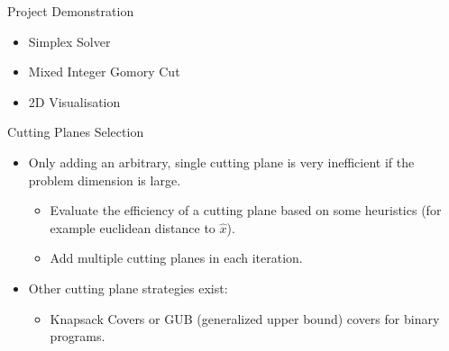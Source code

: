 \begin{frame}{Project Demonstration}
\begin{itemize}
\item Simplex Solver
\item Mixed Integer Gomory Cut
\item 2D Visualisation
\end{itemize}

%    
\end{frame}

\begin{frame}{Cutting Planes Selection}
\begin{itemize}[<+->]
\item Only adding an arbitrary, single cutting plane is very inefficient if the problem dimension is large.
\begin{itemize}
\item Evaluate the efficiency of a cutting plane based on some heuristics (for example euclidean distance to $\hat{x}$).
\item Add multiple cutting planes in each iteration.
\end{itemize}
\item Other cutting plane strategies exist:
\begin{itemize}
\item Knapsack Covers or GUB (generalized upper bound) covers for binary programs.
\end{itemize}
\end{itemize}
\end{frame}
